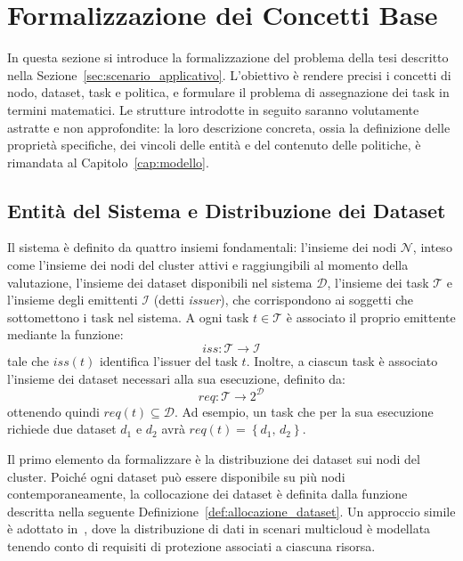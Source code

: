 
\section{Formalizzazione dei Concetti Base}
\label{sec:formalizzazione_base}

In questa sezione si introduce la formalizzazione del problema della tesi descritto nella Sezione~\ref{sec:scenario_applicativo}. L'obiettivo è rendere precisi i concetti di nodo, dataset, task e politica, e formulare il problema di assegnazione dei task in termini matematici. Le strutture introdotte in seguito saranno volutamente astratte e non approfondite: la loro descrizione concreta, ossia la definizione delle proprietà specifiche, dei vincoli delle entità e del contenuto delle politiche, è rimandata al Capitolo~\ref{cap:modello}.


\subsection{Entità del Sistema e Distribuzione dei Dataset}
\label{subsec:entita_sistema}

Il sistema è definito da quattro insiemi fondamentali: l'insieme dei nodi $\mathcal{N}$, inteso come l'insieme dei nodi del cluster attivi e raggiungibili al momento della valutazione, l'insieme dei dataset disponibili nel sistema $\mathcal{D}$, l'insieme dei task $\mathcal{T}$ e l'insieme degli emittenti $\mathcal{I}$ (detti \emph{issuer}), che corrispondono ai soggetti che sottomettono i task nel sistema. A ogni task $t \in \mathcal{T}$ è associato il proprio emittente mediante la funzione:
\begin{equation}
    iss: \mathcal{T} \rightarrow \mathcal{I}
\end{equation}
tale che $iss(t)$ identifica l'issuer del task $t$. Inoltre, a ciascun task è associato l'insieme dei dataset necessari alla sua esecuzione, definito da:
\begin{equation}
    req: \mathcal{T} \rightarrow 2^\mathcal{D}
\end{equation}
ottenendo quindi $req(t) \subseteq \mathcal{D}$. Ad esempio, un task che per la sua esecuzione richiede due dataset $d_1$ e $d_2$ avrà $req(t) = \left\{ d_1,\, d_2 \right\}$.

Il primo elemento da formalizzare è la distribuzione dei dataset sui nodi del cluster. Poiché ogni dataset può essere disponibile su più nodi contemporaneamente, la collocazione dei dataset è definita dalla funzione descritta nella seguente Definizione~\ref{def:allocazione_dataset}. Un approccio simile è adottato in~\cite{sec-aware-data-alloc-multicloud}, dove la distribuzione di dati in scenari multicloud è modellata tenendo conto di requisiti di protezione associati a ciascuna risorsa.

